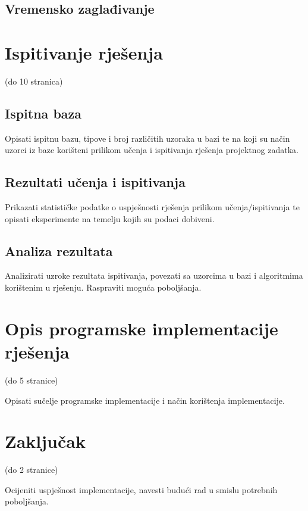 \documentclass[times, utf8, diplomski]{fer}
\begin{document}
\section{Vremensko zaglađivanje}

\chapter{Ispitivanje rješenja}

(do 10 stranica)

\section{Ispitna baza}

Opisati ispitnu bazu, tipove i broj različitih uzoraka u bazi te na koji su način uzorci iz baze korišteni prilikom učenja i ispitivanja rješenja projektnog zadatka. 

\section{Rezultati učenja i ispitivanja}

Prikazati statističke podatke o uspješnosti rješenja prilikom učenja/ispitivanja te opisati eksperimente na temelju kojih su podaci dobiveni.

\section{Analiza rezultata}

Analizirati uzroke rezultata ispitivanja, povezati sa uzorcima u bazi i algoritmima korištenim u rješenju. Raspraviti moguća poboljšanja.

\chapter{Opis programske implementacije rješenja}

(do 5 stranice)

Opisati sučelje programske implementacije i način korištenja implementacije.


\chapter{Zaključak}

(do 2 stranice)

Ocijeniti uspješnost implementacije, navesti budući rad u smislu potrebnih poboljšanja. 
\end{document}
